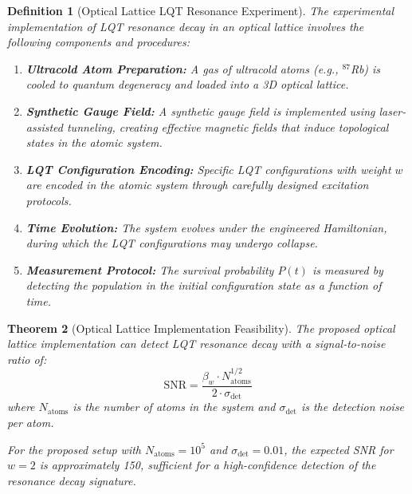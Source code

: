 \documentclass[11pt,a4paper]{article}
\newtheorem{theorem}{Theorem}[section]
\newtheorem{definition}[theorem]{Definition}
\begin{document}
\begin{definition}[Optical Lattice LQT Resonance Experiment]
\label{def:optical_lattice}
The experimental implementation of LQT resonance decay in an optical lattice involves the following components and procedures:

\begin{enumerate}
    \item \textbf{Ultracold Atom Preparation:} A gas of ultracold atoms (e.g., $^{87}$Rb) is cooled to quantum degeneracy and loaded into a 3D optical lattice.
    
    \item \textbf{Synthetic Gauge Field:} A synthetic gauge field is implemented using laser-assisted tunneling, creating effective magnetic fields that induce topological states in the atomic system.
    
    \item \textbf{LQT Configuration Encoding:} Specific LQT configurations with weight $w$ are encoded in the atomic system through carefully designed excitation protocols.
    
    \item \textbf{Time Evolution:} The system evolves under the engineered Hamiltonian, during which the LQT configurations may undergo collapse.
    
    \item \textbf{Measurement Protocol:} The survival probability $P(t)$ is measured by detecting the population in the initial configuration state as a function of time.
\end{enumerate}
\end{definition}

\begin{theorem}[Optical Lattice Implementation Feasibility]
\label{thm:optical_lattice_feasibility}
The proposed optical lattice implementation can detect LQT resonance decay with a signal-to-noise ratio of:
\begin{equation}
\text{SNR} = \frac{\beta_w \cdot N_{\text{atoms}}^{1/2}}{2 \cdot \sigma_{\text{det}}}
\end{equation}
where $N_{\text{atoms}}$ is the number of atoms in the system and $\sigma_{\text{det}}$ is the detection noise per atom.

For the proposed setup with $N_{\text{atoms}} = 10^5$ and $\sigma_{\text{det}} = 0.01$, the expected SNR for $w=2$ is approximately 150, sufficient for a high-confidence detection of the resonance decay signature.
\end{theorem}
\end{document}
